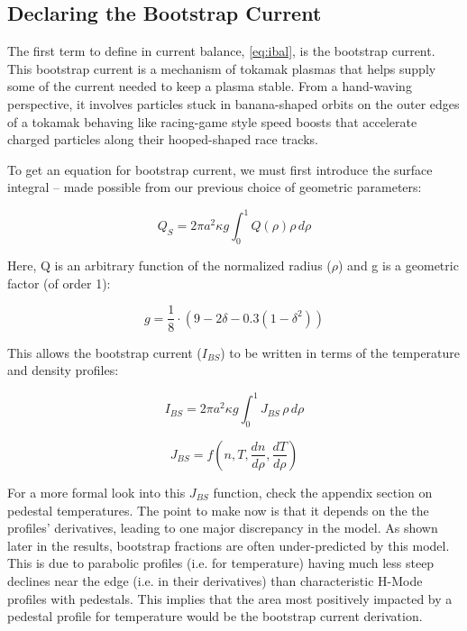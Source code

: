 \subsection{Declaring the Bootstrap Current}

The first term to define in current balance, \cref{eq:ibal}, is the bootstrap current. This bootstrap current is a mechanism of tokamak plasmas that helps supply some of the current needed to keep a plasma stable. From a hand-waving perspective, it involves particles stuck in banana-shaped orbits on the outer edges of a tokamak behaving like racing-game style speed boosts that accelerate charged particles along their hooped-shaped race tracks.

To get an equation for bootstrap current, we must first introduce the surface integral -- made possible from our previous choice of geometric parameters:

\begin{equation}
	\label{eq:qs}
	Q_S = 2 \pi a^2 \kappa g \int_0^1 Q(\rho) \rho \, d\rho
\end{equation}

Here, Q is an arbitrary function of the normalized radius ($\rho$) and g is a geometric factor (of order 1):

\begin{equation}
	g = \frac{1}{8} \cdot \left( 9 - 2 \delta - 0.3 \left( 1 - \delta^2 \right)  \right)
\end{equation}
 
This allows the bootstrap current ($I_{BS}$) to be written in terms of the temperature and density profiles:

\begin{equation}
	I_{BS} = 2 \pi a^2 \kappa g \int_0^1 J_{BS} \, \rho \, d\rho
\end{equation}

\begin{equation}
	J_{BS} = f\left( n , T , \frac{dn}{d\rho} , \frac{dT}{d\rho}  \right)
\end{equation}
 
For a more formal look into this $J_{BS}$ function, check the appendix section on pedestal temperatures. The point to make now is that it depends on the the profiles' derivatives, leading to one major discrepancy in the model. As shown later in the results, bootstrap fractions are often under-predicted by this model. This is due to parabolic profiles (i.e. for temperature) having much less steep declines near the edge (i.e. in their derivatives) than characteristic H-Mode profiles with pedestals. This implies that the area most positively impacted by a pedestal profile for temperature would be the bootstrap current derivation.

